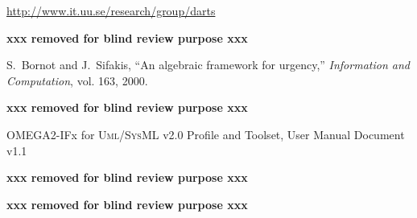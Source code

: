 \documentclass[a4paper,twoside]{article}
\def\sysml{\textsc{SysML}}
\def\UML{\textsc{Uml}}
\def\uml{\textsc{Uml}}
\newcommand{\final}[1]{\textbf{xxx removed for blind review purpose xxx}}
\begin{document}
\begin{thebibliography}{1}
 \url{http://www.it.uu.se/research/group/darts}

\final{I.~Ober and I.~Dragomir, ``{Unambiguous \UML{} Composite Structures: The OMEGA2 Experience},'' in \emph{SOFSEM 2011: Theory and Practice of Computer Science}, \hskip 1em plus 0.5em minus 0.4em\relax Springer, 2011, vol. 6543, pp. 418--430.}


S.~Bornot and J.~Sifakis, ``{An algebraic framework for urgency},'' \emph{Information and Computation}, vol. 163, 2000.

\final{M.~Bozga, S.~Graf, I.~Ober, I.~Ober, and J.~Sifakis, ``{The IF Toolset},'' in \emph{Formal Methods for the Design of Real-Time Systems}, \hskip 1em plus 0.5em minus 0.4em\relax Springer, 2004, vol. 3185, pp. 131--132.}

 OMEGA2-IFx for \uml{}/\sysml{} v2.0 Profile and Toolset, User Manual Document v1.1

 \final{Manzoor Ahmad, Iulia Dragomir. AAL System Properties Modeling and Verification Using OMEGA2/IFx, Internal Report, Universit\'e de Toulouse.}


 \final{Jean-Michel Bruel, Nicolas Belloir and Manzoor Ahmad. SPAS: un profile \sysml{} pour les syst\`emes auto-adaptatifs, CNRIUT, Lille June 2009.}





\end{thebibliography}

%
\vfill
\end{document}
